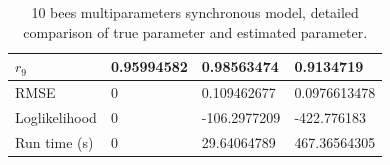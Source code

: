 \documentclass[12pt]{article}
\theoremstyle{definition}
\begin{document}
\begin{table}[H]
\begin{tabular}{|l|l|l|l|}
$r_9$                        & 0.95994582 & 0.98563474                                                                & 0.9134719                                                            \\ \hline
RMSE                         & 0                 & 0.109462677                                                                       & 0.0976613478                                                                  \\ \hline
Loglikelihood                & 0                 & -106.2977209                                                                      & -422.776183                                                                   \\ \hline
Run time (s)                 & 0                 & 29.64064789                                                                       & 467.36564305                                                                  \\ \hline
\end{tabular}
\caption{10 bees multiparameters synchronous model, detailed comparison of true
  parameter and estimated parameter.}
\end{table}
\end{document}
